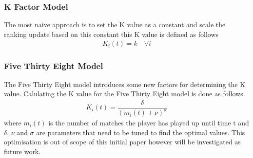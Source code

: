 \documentclass[12pt,a4paper]{article}
\begin{document}
\subsubsection{K Factor Model}
The most naive approach is to set the K value as a constant and scale the ranking
update based on this constant this K value is defined as follows
\begin{gather}
  K_i(t) = k \quad \forall i
\end{gather}
\subsubsection{Five Thirty Eight Model}
The Five Thirty Eight model introduces some new factors for determining the K
value. Calulating the K value for the Five Thirty Eight model is done as follows.
\begin{gather}
  K_i(t) = \dfrac{\delta}{{(m_i(t) + \nu)}^{\sigma}}
\end{gather}
where $m_i(t)$ is the number of matches the player has played up until time t and
$\delta$, $\nu$ and $\sigma$ are parameters that need to be tuned to find the
optimal values. This optimisation is out of scope of this initial paper however will be
investigated as future work.
\end{document}
